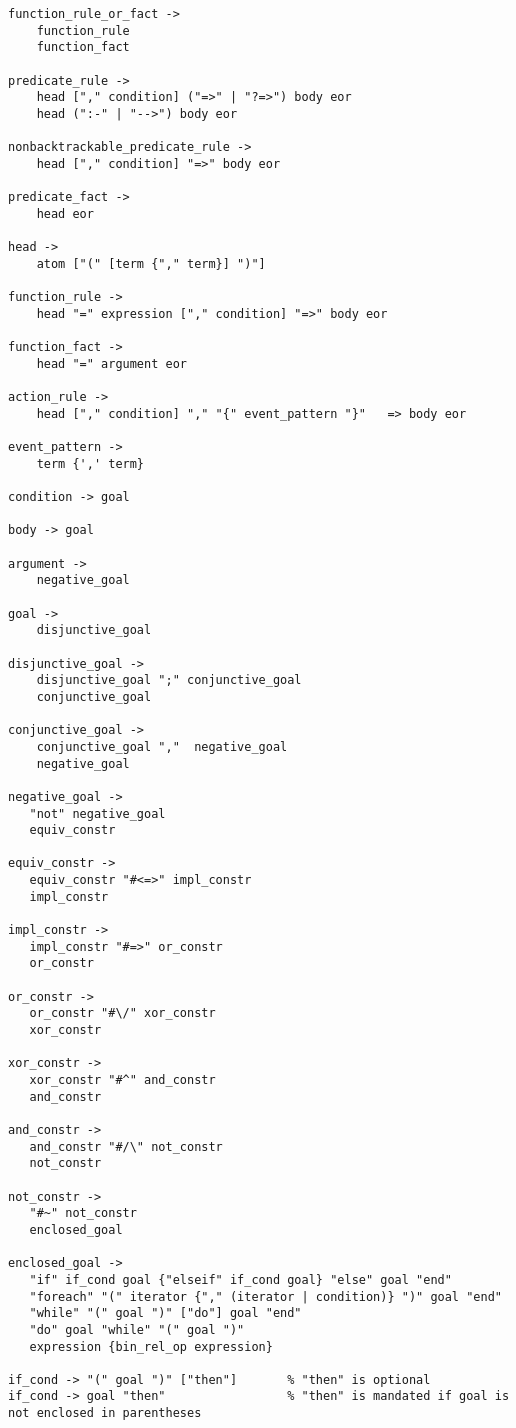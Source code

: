 \begin{scriptsize}
\begin{verbatim}
function_rule_or_fact ->
    function_rule
    function_fact

predicate_rule ->
    head ["," condition] ("=>" | "?=>") body eor
    head (":-" | "-->") body eor

nonbacktrackable_predicate_rule ->
    head ["," condition] "=>" body eor

predicate_fact ->
    head eor

head ->
    atom ["(" [term {"," term}] ")"]

function_rule ->
    head "=" expression ["," condition] "=>" body eor    

function_fact ->
    head "=" argument eor

action_rule ->
    head ["," condition] "," "{" event_pattern "}"   => body eor

event_pattern ->
    term {',' term}

condition -> goal

body -> goal

argument ->
    negative_goal

goal ->
    disjunctive_goal

disjunctive_goal ->
    disjunctive_goal ";" conjunctive_goal
    conjunctive_goal

conjunctive_goal ->
    conjunctive_goal ","  negative_goal
    negative_goal

negative_goal ->
   "not" negative_goal
   equiv_constr

equiv_constr ->
   equiv_constr "#<=>" impl_constr
   impl_constr

impl_constr ->
   impl_constr "#=>" or_constr
   or_constr

or_constr ->
   or_constr "#\/" xor_constr
   xor_constr

xor_constr ->
   xor_constr "#^" and_constr
   and_constr

and_constr ->
   and_constr "#/\" not_constr
   not_constr

not_constr ->
   "#~" not_constr
   enclosed_goal

enclosed_goal ->
   "if" if_cond goal {"elseif" if_cond goal} "else" goal "end"
   "foreach" "(" iterator {"," (iterator | condition)} ")" goal "end"
   "while" "(" goal ")" ["do"] goal "end"
   "do" goal "while" "(" goal ")"
   expression {bin_rel_op expression}

if_cond -> "(" goal ")" ["then"]       % "then" is optional
if_cond -> goal "then"                 % "then" is mandated if goal is not enclosed in parentheses


\end{verbatim}
\end{scriptsize}
